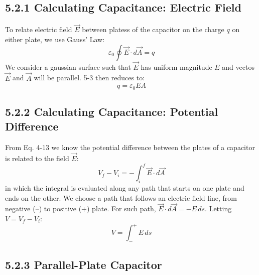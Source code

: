 \documentclass[12pt, a4paper]{article}
\begin{document}
		\subsection*{5.2.1 Calculating Capacitance: Electric Field}
		
		To relate electric field $\vec{E}$ between platess of the capacitor on the charge $q$ on either plate, we use Gauss' Law:
		\begin{equation*}
			\varepsilon_0 \oint \vec{E} \cdot d\vec{A} = q
			\tag{5-3}
		\end{equation*}
		We consider a gaussian surface such that $\vec{E}$ has uniform magnitude $E$ and vectos $\vec{E}$ and $\vec{A}$ will be parallel. 5-3 then reduces to:
		\begin{equation*}
			q = \varepsilon_0 E A 
			\tag{5-4}
		\end{equation*}
			
		\subsection*{5.2.2 Calculating Capacitance: Potential Difference}
		
		From Eq. 4-13 we know the potential difference between the plates of a capacitor is related to the field $\vec{E}$:
		\begin{equation*}
			V_f - V_i = - \int_{i}^{f} \vec{E} \cdot d\vec{A}
			\tag{5-5}
		\end{equation*}
		in which the integral is evaluated along any path that starts on one plate and ends on the other. We choose a path that follows an electric field line, from negative (--) to positive (+) plate. For such path, $\vec{E} \cdot d\vec{A} = -E \, ds$. Letting $V = V_f - V_i$:
		\begin{equation*}
			V = \int_{-}^{+} E \, ds
			\tag{5-6}
		\end{equation*}
		
		
		
		\subsection*{5.2.3 Parallel-Plate Capacitor}
			
\end{document}
